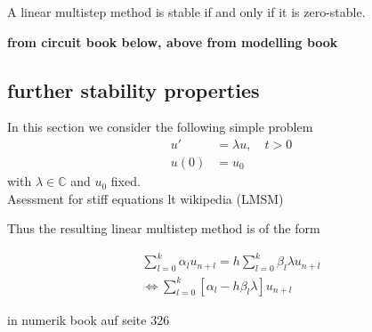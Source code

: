 	\begin{theorem}
		A linear multistep method is stable if and only if it is zero-stable.
	\end{theorem}
	
	\textbf{from circuit book below, above from modelling book}
	
	\subsection{further stability properties}
	
	In this section we consider the following simple problem
	\begin{align}
		u' &= \lambda u, \quad t > 0 \\
		u(0) &= u_0
	\end{align}
	with $\lambda \in \mathbb{C}$ and $u_0$ fixed.\\
	
	Asessment for stiff equations lt wikipedia (LMSM)
	
	Thus the resulting linear multistep method is of the form
	
	\begin{align*}
		\sum_{l=0}^{k} \alpha_l u_{n+l} = h \sum_{l=0}^{k} \beta_l \lambda u_{n+l} \\
		\iff \sum_{l=0}^{k}  [\alpha_l - h \beta_l \lambda] u_{n+l}
	\end{align*}
	
	in numerik book auf seite 326
	
